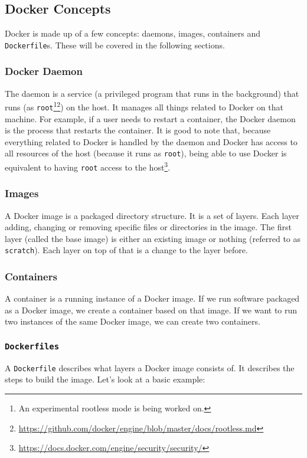 \subsection{Docker Concepts}
Docker is made up of a few concepts: daemons, images, containers and \lstinline{Dockerfile}s. These will be covered in the following sections.

\subsubsection{Docker Daemon}
The daemon is a service (a privileged program that runs in the background) that runs (as \lstinline{root}\footnote{An experimental rootless mode is being worked on.}\footnote{\url{https://github.com/docker/engine/blob/master/docs/rootless.md}}) on the host. It manages all things related to Docker on that machine. For example, if a user needs to restart a container, the Docker daemon is the process that restarts the container. It is good to note that, because everything related to Docker is handled by the daemon and Docker has access to all resources of the host (because it runs as \lstinline{root}), being able to use Docker is equivalent to having \lstinline{root} access to the host\footnote{\url{https://docs.docker.com/engine/security/security/}}.

\subsubsection{Images}
A Docker image is a packaged directory structure. It is a set of layers. Each layer adding, changing or removing specific files or directories in the image. The first layer (called the base image) is either an existing image or nothing (referred to as \lstinline{scratch}). Each layer on top of that is a change to the layer before.

\subsubsection{Containers}
A container is a running instance of a Docker image. If we run software packaged as a Docker image, we create a container based on that image. If we want to run two instances of the same Docker image, we can create two containers.

\subsubsection{\texorpdfstring{\lstinline{Dockerfiles}}{Dockerfiles}}
A \lstinline{Dockerfile} describes what layers a Docker image consists of. It describes the steps to build the image. Let's look at a basic example:

